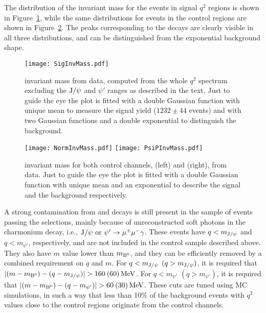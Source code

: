 The distribution of the \PBz invariant mass for the events in signal $q^2$ regions is shown in Figure~\ref{fig:sigInvMass}, while the same distributions for events in the control regions are shown in Figure~\ref{fig:normInvMass}.
The peaks corresponding to the \PBz decays are clearly visible in all three distributions, and can be distinguished from the exponential background shape.

\begin{figure}[hbtp]
  \begin{center}
    \texttt{[image: SigInvMass.pdf]}
    \caption{\PBz invariant mass from data, computed from the whole $q^2$ spectrum excluding the $\textrm{J}/\psi$ and $\psi'$ ranges as described in the text.
      Just to guide the eye the plot is fitted with a double Gaussian function with unique mean to measure the signal yield
      ($1232 \pm 44$ events) and with two Gaussian functions and a double exponential to distinguish the background.}
    \label{fig:sigInvMass}
  \end{center}
\end{figure}

\begin{figure}[hbtp]
  \begin{center}
    \texttt{[image: NormInvMass.pdf]}
    \texttt{[image: PsiPInvMass.pdf]}
    \caption{\PBz invariant mass for both control channels, \BtoKstJpsimumu (left) and \BtoKstpsipmumu (right), from data.
      Just to guide the eye the plot is fitted with a double Gaussian function with unique mean and an exponential to describe the signal and the background respectively.}
    \label{fig:normInvMass}
  \end{center}
\end{figure}

A strong contamination from \BtoKstJpsi and \BtoKstpsip decays is still present in the sample of events passing the selections, mainly because of unreconstructed soft photons in the charmonium decay, i.e., $\textrm{J}/\psi\ {\rm or}\ \psi' \to \mu^{+} \mu^{-} \gamma$.
These events have $q<m_{\textrm{J}/\psi}$ and $q<m_{\psi'}$, respectively, and are not included in the control sample described above.
They also have $m$ value lower than $m_{{\textrm{B}}{}^{0}}$, and they can be efficiently removed by a combined requirement on $q$ and $m$.
For $q<m_{\textrm{J}/\psi}$ $(q>m_{\textrm{J}/\psi})$, it is required that $\lvert(m-m_{{\textrm{B}}{}^{0}})-(q-m_{\textrm{J}/\psi})\rvert>160\: (60)\,\textrm{MeV}$.
For $q<m_{\psi'}$ $(q>m_{\psi'})$, it is required that $\lvert(m-m_{{\textrm{B}}{}^{0}})-(q-m_{\psi'})\rvert>60\: (30)\,\textrm{MeV}$.
These cuts are tuned using MC simulations, in such a way that less than 10\% of the background events with $q^2$ values close to the control regions originate from the control channels.

